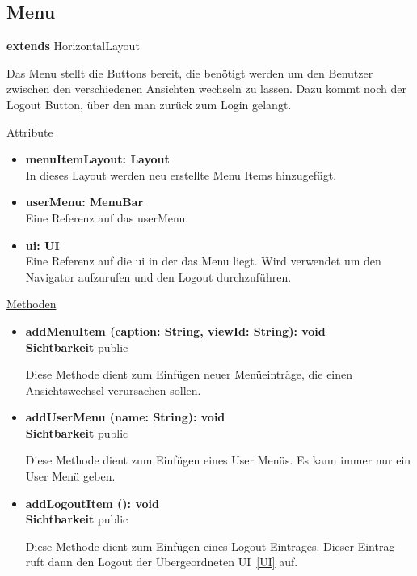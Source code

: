 \newpage
\subsection{Menu}\label{Menu}
\textbf{extends}  HorizontalLayout \newline

Das Menu stellt die Buttons bereit, die benötigt werden um den Benutzer zwischen den verschiedenen Ansichten wechseln zu lassen. Dazu kommt noch der Logout Button, über den man zurück zum Login gelangt.
\newline

\underline{Attribute}
\begin{itemize}
\itemsep0pt

\item \textbf{menuItemLayout: Layout} \hfill\\ 
In dieses Layout werden neu erstellte Menu Items hinzugefügt.

\item \textbf{userMenu: MenuBar} \hfill\\ 
Eine Referenz auf das userMenu.

\item \textbf{ui: UI} \hfill\\ 
Eine Referenz auf die ui in der das Menu liegt. Wird verwendet um den Navigator aufzurufen und den Logout durchzuführen.

\end{itemize}

\underline{Methoden}
\begin{itemize}
\itemsep0pt
\item \textbf{addMenuItem (caption: String, viewId: String): void}\hfill\\
\textbf{Sichtbarkeit} public

Diese Methode dient zum Einfügen neuer Menüeinträge, die einen Ansichtswechsel verursachen sollen.

\item \textbf{addUserMenu (name: String): void}\hfill\\
\textbf{Sichtbarkeit} public

Diese Methode dient zum Einfügen eines User Menüs. Es kann immer nur ein User Menü geben.

\item \textbf{addLogoutItem (): void}\hfill\\
\textbf{Sichtbarkeit} public

Diese Methode dient zum Einfügen eines Logout Eintrages. Dieser Eintrag ruft dann den Logout der Übergeordneten UI~\eqref{UI} auf.

\end{itemize}